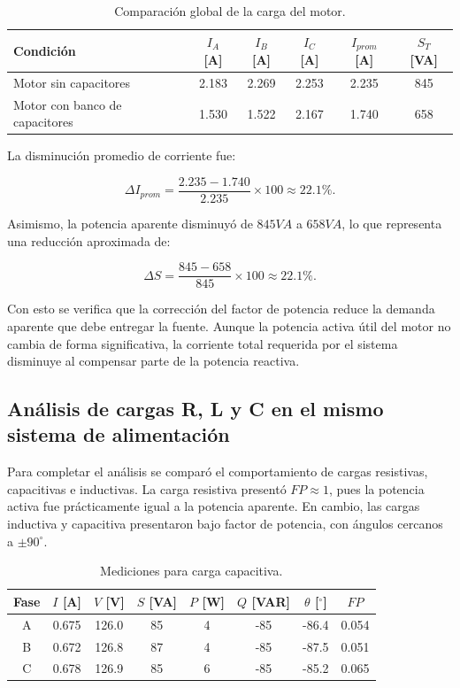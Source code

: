 	\begin{table}[H]
		\centering
		\caption{Comparación global de la carga del motor.}
		\label{tab:comparacion_motor}
			\begin{tabular}{l c c c c c}
				\toprule
				Condición & \(I_A\) [A] & \(I_B\) [A] & \(I_C\) [A] & \(I_{prom}\) [A] & \(S_T\) [VA] \\
				\midrule
				Motor sin capacitores & 2.183 & 2.269 & 2.253 & 2.235 & 845 \\
				Motor con banco de capacitores & 1.530 & 1.522 & 2.167 & 1.740 & 658 \\
				\bottomrule
		\end{tabular}
	\end{table}
	
	La disminución promedio de corriente fue:
	
	\begin{equation}
		\Delta I_{prom}=\frac{2.235-1.740}{2.235}\times100\approx22.1\%.
	\end{equation}
	
	Asimismo, la potencia aparente disminuyó de \(845\unit{VA}\) a \(658\unit{VA}\), lo que representa una reducción aproximada de:
	
	\begin{equation}
		\Delta S=\frac{845-658}{845}\times100\approx22.1\%.
	\end{equation}
	
	Con esto se verifica que la corrección del factor de potencia reduce la demanda aparente que debe entregar la fuente. Aunque la potencia activa útil del motor no cambia de forma significativa, la corriente total requerida por el sistema disminuye al compensar parte de la potencia reactiva.
	
	\subsection{Análisis de cargas R, L y C en el mismo sistema de alimentación}
	
	Para completar el análisis se comparó el comportamiento de cargas resistivas, capacitivas e inductivas. La carga resistiva presentó \(FP\approx1\), pues la potencia activa fue prácticamente igual a la potencia aparente. En cambio, las cargas inductiva y capacitiva presentaron bajo factor de potencia, con ángulos cercanos a \(\pm90^{\circ}\).
	
	\begin{table}[H]
		\centering
		\caption{Mediciones para carga capacitiva.}
		\label{tab:carga_capacitiva}
			\begin{tabular}{c c c c c c c c}
				\toprule
				Fase & \(I\) [A] & \(V\) [V] & \(S\) [VA] & \(P\) [W] & \(Q\) [VAR] & \(\theta\) [\(^\circ\)] & \(FP\) \\
				\midrule
				A & 0.675 & 126.0 & 85 & 4 & -85 & -86.4 & 0.054 \\
				B & 0.672 & 126.8 & 87 & 4 & -85 & -87.5 & 0.051 \\
				C & 0.678 & 126.9 & 85 & 6 & -85 & -85.2 & 0.065 \\
				\bottomrule
		\end{tabular}
	\end{table}
	
